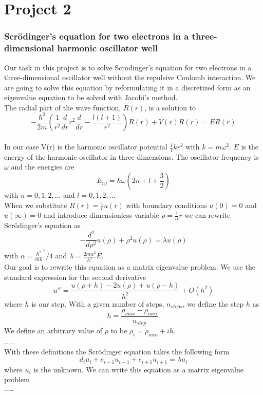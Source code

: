 \documentclass[a4paper,12pt, english]{article}
\begin{document}
\section*{Project 2}
\subsubsection*{Scr\"odinger's equation for two electrons in a three-dimensional harmonic oscillator well }

Our task in this project is to solve Scr\"odinger's equation for two electrons in a three-dimensional oscillator well without the repulsive Coulomb interaction. We are going to solve this equation by reformulating it in a discretized form as an eigenvalue equation to be solved with Jacobi's method. 
\\
The radial part of the wave function, $R(r)$, is a solution to 
$$ -\frac{\hbar^2}{2m}(\frac{1}{r^2}\frac{d}{dr}r^2\frac{d}{dr} - \frac{l(l+1)}{r^2})R(r) + V(r)R(r) = ER(r)  $$
\\
In our case V(r) is the harmonic oscillator potential $\frac{1}{1}kr^2$ with $k=m\omega^2$. $E$ is the energy of the harmonic oscillator in three dimensions. The oscillator frequency is $\omega$ and the energies are
$$ {E_n}_l = \hbar\omega(2n + l + \frac{3}{2}) $$
with $n = 0,1,2,...$ and $l = 0,1,2,...$  \\
When we substitute $R(r) = \frac{1}{r}u(r)$ with boundary conditions $u(0) = 0$ and $u(\infty) = 0$ and introduce dimensionless variable $\rho = \frac{1}{\alpha}r$ we can rewrite Scr\"odinger's equation as 
$$ - \frac{d^2}{d\rho^2}u(\rho) + \rho^2u(\rho) = \lambda u(\rho) $$
with $\alpha = \frac{\hbar^2}{mk}^1/4$ and $\lambda = \frac{2m\alpha^2}{\hbar^2}E$. \\
Our goal is to rewrite this equation as a matrix eigenvalue problem. We use the standard expression for the second derivative $$ u'' = \frac{u(\rho + h) -2u(\rho) + u(\rho -h)}{h^2} + O(h^2) $$
where $h$ is our step.
With a given number of steps, $n_{steps}$, we define the step $h$ as $$h = \frac{\rho_{max}-\rho_{min}}{n_{step}}. $$
We define an arbitrary value of $\rho$ to be $\rho_i = \rho_{min} + ih$. \\
.....\\

With these definitions the Scr\"odinger equation takes the following form $$ d_iu_i + e_{i-1}u_{i-1} + e_{i+1}u_{i+1} = \lambda u_i $$
where $u_i$ is the unknown. We can write this equation as a matrix eigenvalue problem \\
----
\\
\end{document}
